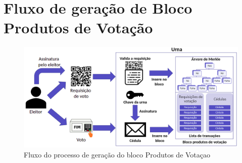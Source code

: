 \chapter{Fluxo de geração de Bloco Produtos de Votação}

\begin{figure}[h!]
	\centering
	\includegraphics[width=\textwidth]{imagens/fluxo_voto}
	\caption{Fluxo do processo de geração do bloco Produtos de Votaçao}
	\label{fig:fluxo_voto}
\end{figure}